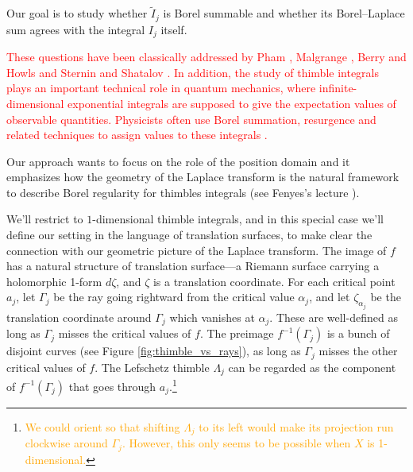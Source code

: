 \documentclass{article}
\theoremstyle{definition}
\begin{document}
Our goal is to study whether $\tilde{I}_j$ is Borel summable and whether its Borel--Laplace sum agrees with the integral $I_j$ itself. 

\textcolor{red}{These questions have been classically addressed by Pham \cite[Section 3.3]{pham}, Malgrange \cite[Theorem 6]{Malgrange22}, Berry and Howls \cite{berry1991hyperasymptotics} and Sternin and Shatalov \cite[Theorem 3.9 and 3.10]{sternin1995borel}. In addition, the study of thimble integrals plays an important technical role in quantum mechanics, where infinite-dimensional exponential integrals are supposed to give the expectation values of observable quantities. Physicists often use Borel summation, resurgence and related techniques to assign values to these integrals \cite{costin_kruskal,delabaere_dillinger_pham,delabaere-howls,Delabaere-Pham99,dingle1973asymptotic,dunne-unsal,gukov-marino-purtrov-resurgence,pham1988resurgence,Howls}.}

Our approach wants to focus on the role of the position domain and it emphasizes how the geometry of the Laplace transform is the natural framework to describe Borel regularity for thimbles integrals (see Fenyes's lecture \cite{Fenyes-ihes-lecture}).  

We’ll restrict to $1$-dimensional thimble integrals, and in this special case we’ll define our setting in the language of translation surfaces, to make clear the connection with our geometric picture of the Laplace transform. The image of $f$ has a natural structure of translation surface---a Riemann surface carrying a holomorphic 1-form $d\zeta$, and $\zeta$ is a translation coordinate. 
For each critical point $a_j$, let $\Gamma_j$ be the ray going rightward from the critical value $\alpha_j$, and let $\zeta_{\alpha_j}$ be the translation coordinate around $\Gamma_j$ which vanishes at $\alpha_j$. These are well-defined as long as $\Gamma_j$ misses the critical values of $f$. The preimage $f^{-1}(\Gamma_j)$ is a bunch of disjoint curves (see Figure \ref{fig:thimble_vs_rays}), as long as $\Gamma_j$ misses the other critical values of $f$. The Lefschetz thimble $\Lambda_j$ can be regarded as the component of $f^{-1}(\Gamma_j)$ that goes through $a_j$.\footnote{\textcolor{orange}{We could orient so that shifting $\Lambda_j$ to its left would make its projection run clockwise around $\Gamma_j$. However, this only seems to be possible when $X$ is 1-dimensional.}}
\end{document}
